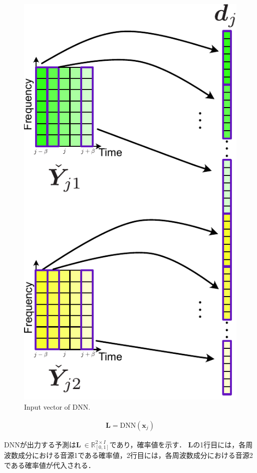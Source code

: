 \begin{figure}[t]
    \begin{center}
        \includegraphics[width=0.8\columnwidth]{figures/DNN_input.pdf}
    \end{center}
    \vspace{-8pt}
	\caption{Input vector of DNN.}
	\label{fig:DNN_input}
\end{figure}

\begin{align}
    \bm{L} = \mathrm{DNN}(\bm{x}_j)
\end{align}

DNNが出力する予測は$\bm{L} ~\in \mathbb{R}_{[0,1]}^{2 \times I}$であり，確率値を示す．
$\bm{L}$の1行目には，各周波数成分における音源1である確率値，2行目には，各周波数成分における音源2である確率値が代入される．

